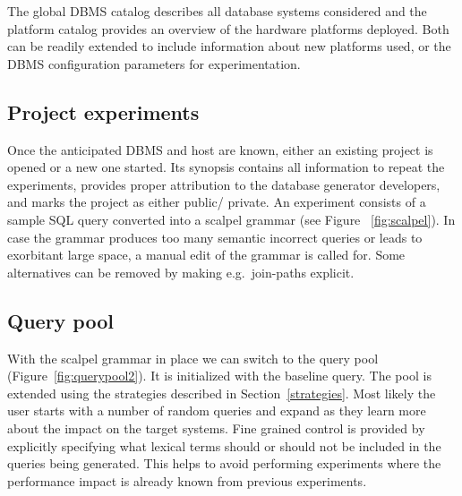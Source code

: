 \documentclass{cidr-2019}
\begin{document}

The global DBMS catalog describes all database systems considered and
the platform catalog provides an overview of the hardware platforms
deployed. Both can be readily extended to include information about
new platforms used, or the DBMS configuration parameters for
experimentation.

\subsection{Project experiments}
Once the anticipated DBMS and host are known, either an existing
project is opened or a new one started. Its synopsis contains all
information to repeat the experiments, provides proper attribution to
the database generator developers, and marks the project as either
public/ private. An experiment consists of a sample SQL query
converted into a scalpel grammar (see Figure ~\ref{fig:scalpel}). In
case the grammar produces too many semantic incorrect queries or leads
to exorbitant large space, a manual edit of the grammar is called
for. Some alternatives can be removed by making e.g.\ join-paths
explicit.

\subsection{Query pool}
With the scalpel grammar in place we can switch to the query pool
(Figure~\ref{fig:querypool2}). It is initialized with the baseline
query.
The pool is extended using the strategies described in
Section~\ref{strategies}. Most likely the user starts with a number of
random queries and expand as they learn more about the impact on the
target systems. Fine grained control is provided by explicitly
specifying what lexical terms should or should not be included in the
queries being generated. This helps to avoid performing experiments
where the performance impact is already known from previous
experiments.
\end{document}
